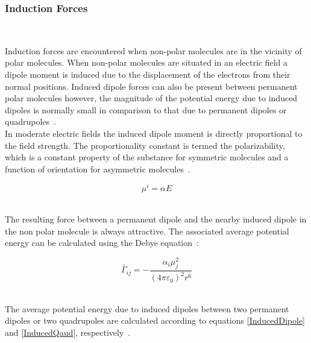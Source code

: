 \subsubsection{Induction Forces}\

Induction forces are encountered when non-polar molecules are in the vicinity of polar molecules. When non-polar molecules are situated in an electric field a dipole moment is induced due to the displacement of the electrons from their normal positions. Induced dipole forces can also be present between permanent polar molecules however, the magnitude of the potential energy due to induced dipoles is normally small in comparison to that due to permanent dipoles or quadrupoles~\cite{MolecularThermodynamicsOfFluidPhaseEquilibria}.\\

In moderate electric fields the induced dipole moment is directly proportional to the field strength. The proportionality constant is termed the polarizability, which is a constant property of the substance for symmetric molecules and a function of orientation for asymmetric molecules~\cite{MolecularThermodynamicsOfFluidPhaseEquilibria}.\

\begin{equation}
\mu^{i} = \alpha E
\end{equation}\


The resulting force between a permanent dipole and the nearby induced dipole in the non polar molecule is always attractive. The associated average potential energy can be calculated using the Debye equation~\cite{MolecularThermodynamicsOfFluidPhaseEquilibria}:\

\begin{equation}
\bar{\Gamma}_{ij} = -\frac{\alpha_{i}\mu_{j}^{2}}{\left(4\pi\varepsilon_{0}\right)^{2}r^{6}}
\end{equation}\

The average potential energy due to induced dipoles between two permanent dipoles or two quadrupoles are calculated according to equations \ref{InducedDipole} and \ref{InducedQaud}, respectively~\cite{MolecularThermodynamicsOfFluidPhaseEquilibria}.\

